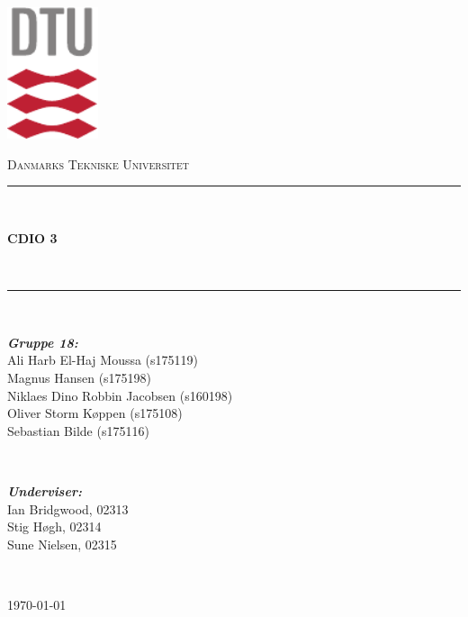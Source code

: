 \begin{titlepage}
	\centering
	\includegraphics[width=0.2\textwidth]{graphics/dtu/DTU-logo-CMYK}\par\vspace{1cm}
	{\scshape\LARGE Danmarks Tekniske Universitet \par}
	\vspace{3.5cm}
	\rule{\linewidth}{0.2 mm} \\[0.4 cm]
	{\huge\bfseries CDIO 3 \par} \
	\rule{\linewidth}{0.2 mm} \\[1.5 cm]
	\vspace{1cm}
	
	\begin{minipage}{0.5\textwidth}
		\begin{flushleft}
			\small
			\emph{\textbf{Gruppe 18:}}\\
			Ali Harb El-Haj Moussa (s175119) \\
			Magnus Hansen (s175198) \\
			Niklaes Dino Robbin Jacobsen (s160198) \\
			Oliver Storm Køppen (s175108) \\
			Sebastian Bilde (s175116)
		\end{flushleft}
	\end{minipage}
	~
	\begin{minipage}{0.4\textwidth}
		\begin{flushright}
			\small
			\emph{\textbf{Underviser:}} \\
			Ian Bridgwood, 02313 \\
			Stig Høgh, 02314 \\
			Sune Nielsen, 02315
		\end{flushright}
	\end{minipage}\\[4cm]
	
	\vfill
	{\large \today\par}
\end{titlepage}

\pagebreak

